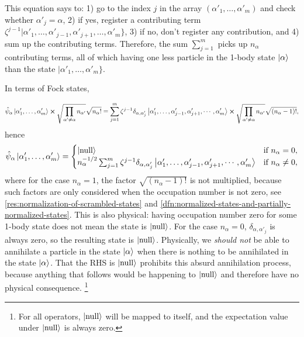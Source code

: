 \documentclass{article}
\theoremstyle{definition}
\theoremstyle{plain}
\numberwithin{equation}{section}
\begin{document}
This equation says to: 1) go to the index $j$ 
in the array 
$(\alpha'_{1}, \ldots ,\alpha'_{m})$ 
and check whether $\alpha'_{j}=\alpha$, 
2) if yes, register a contributing term 
$
    \zeta^{j-1}
    |\alpha'_{1}, \ldots ,\alpha'_{j-1},
    \alpha'_{j+1}, \ldots ,\alpha'_{m}\}
$, 
3) if no, don't register any contribution, and 
4) sum up the contributing terms.
Therefore, the sum 
$\sum_{j=1}^{m}$ picks up $n_{\alpha}$ 
contributing terms, all of which 
having one less particle in the 1-body state 
$\ket{\alpha}$ than the state 
$|\alpha'_{1}, \ldots ,\alpha'_{m}\}$.

In terms of Fock states, 

\[
    \hat{\psi}_{\alpha}
    \ket{\alpha'_{1}, \ldots ,\alpha'_{m}}
    \cross 
    \sqrt{
        \prod_{\alpha'\neq \alpha}
        n_{\alpha'}
    }
    \sqrt{n_{\alpha}!}
    =
    \sum_{j=1}^{m}
    \zeta^{j-1}
    \delta_{\alpha,\alpha'_{j}}
    \ket{
        \alpha'_{1}, \ldots ,
        \alpha'_{j-1},\alpha'_{j+1},
        \cdots ,\alpha'_{m}
    }
    \cross 
    \sqrt{
        \prod_{\alpha'\neq \alpha}
        n_{\alpha'}
    }
    \sqrt{(n_{\alpha}-1)!},
\]
hence 
\[
    \hat{\psi}_{\alpha}
    \ket{\alpha'_{1}, \ldots ,\alpha'_{m}}
    =
    \begin{cases}
        \ket{\text{null}} & \text{if  } n_{\alpha}=0,\\
        n_{\alpha}^{-1 /2}
        \sum_{j=1}^{m}
    \zeta^{j-1}
    \delta_{\alpha,\alpha'_{j}}
    \ket{
        \alpha'_{1}, \ldots ,
        \alpha'_{j-1},\alpha'_{j+1},
        \cdots ,\alpha'_{m}
    }
    & \text{if  } n_{\alpha}\neq 0,
    \end{cases}
\]
where for the case $n_{\alpha}=1$, 
the factor $\sqrt{(n_{\alpha}-1)!}$ 
is not multiplied, because such factors 
are only considered when the occupation number 
is not zero, see \cref{res:normalization-of-scrambled-states} 
and \cref{dfn:normalized-states-and-partially-normalized-states}. 
This is also physical: having occupation number zero 
for some 1-body state does not mean the state is $\ket{\text{null}}$. 
For the case $n_{\alpha}=0$, 
$\delta_{\alpha,\alpha'_{j}}$ is always zero, 
so the resulting state is $\ket{\text{null}}$.
Physically, we 
\emph{should not} be able to annihilate a particle 
in the state $\ket{\alpha}$ when there is nothing 
to be annihilated in the state $\ket{\alpha}$. 
That the RHS is $\ket{\text{null}}$ 
prohibits this absurd annihilation process, because 
anything that follows would 
be happening to $\ket{\text{null}}$ and therefore 
have no physical 
consequence. 
\footnote{
For all operators, 
$\ket{\text{null}}$ will be mapped to itself, 
and the expectation value under $\ket{\text{null}}$ 
is always zero.
}
\end{document}
